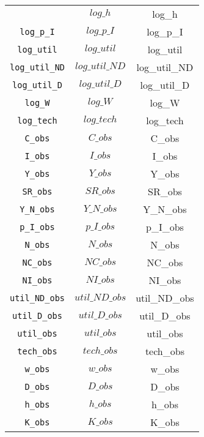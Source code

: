 \begin{center}
\begin{longtable}{ccc}
{\texttt{log\_h} & $log\_h$ & log\_h\\
\texttt{log\_p\_I} & $log\_p\_I$ & log\_p\_I\\
\texttt{log\_util} & $log\_util$ & log\_util\\
\texttt{log\_util\_ND} & $log\_util\_ND$ & log\_util\_ND\\
\texttt{log\_util\_D} & $log\_util\_D$ & log\_util\_D\\
\texttt{log\_W} & $log\_W$ & log\_W\\
\texttt{log\_tech} & $log\_tech$ & log\_tech\\
\texttt{C\_obs} & $C\_obs$ & C\_obs\\
\texttt{I\_obs} & $I\_obs$ & I\_obs\\
\texttt{Y\_obs} & $Y\_obs$ & Y\_obs\\
\texttt{SR\_obs} & $SR\_obs$ & SR\_obs\\
\texttt{Y\_N\_obs} & $Y\_N\_obs$ & Y\_N\_obs\\
\texttt{p\_I\_obs} & $p\_I\_obs$ & p\_I\_obs\\
\texttt{N\_obs} & $N\_obs$ & N\_obs\\
\texttt{NC\_obs} & $NC\_obs$ & NC\_obs\\
\texttt{NI\_obs} & $NI\_obs$ & NI\_obs\\
\texttt{util\_ND\_obs} & $util\_ND\_obs$ & util\_ND\_obs\\
\texttt{util\_D\_obs} & $util\_D\_obs$ & util\_D\_obs\\
\texttt{util\_obs} & $util\_obs$ & util\_obs\\
\texttt{tech\_obs} & $tech\_obs$ & tech\_obs\\
\texttt{w\_obs} & $w\_obs$ & w\_obs\\
\texttt{D\_obs} & $D\_obs$ & D\_obs\\
\texttt{h\_obs} & $h\_obs$ & h\_obs\\
\texttt{K\_obs} & $K\_obs$ & K\_obs\\
\hline%
\end{longtable}
\end{center}

